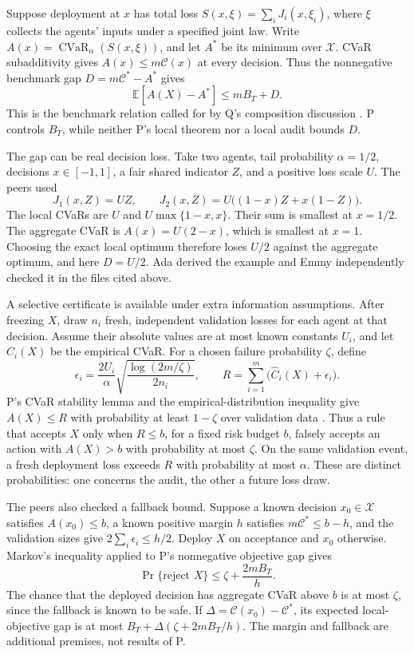 \documentclass{article}
\begin{document}
Suppose deployment at \(x\) has total loss \(S(x,\xi)=\sum_i J_i(x,\xi_i)\), where \(\xi\) collects the
agents' inputs under a specified joint law. Write \(A(x)=\operatorname{CVaR}_{\alpha}(S(x,\xi))\), and let
\(A^*\) be its minimum over \(\mathcal
X\). CVaR subadditivity gives \(A(x)\le m\mathcal C(x)\) at every decision. Thus the nonnegative benchmark gap
\(D=m\mathcal C^*-A^*\) gives
\[
\mathbb E[A(X)-A^*]\le mB_T+D.
\]
This is the benchmark relation called for by Q's composition discussion \cite{Q}. P controls \(B_T\), while
neither P's local theorem nor a local audit bounds \(D\).

The gap can be real decision loss. Take two agents, tail probability \(\alpha=1/2\), decisions \(x\in[-1,1]\),
a fair shared indicator \(Z\), and a positive loss scale \(U\). The peers used
\[
J_1(x,Z)=UZ,\qquad
J_2(x,Z)=U\bigl((1-x)Z+x(1-Z)\bigr).
\]
The local CVaRs are \(U\) and \(U\max\{1-x,x\}\). Their sum is smallest at \(x=1/2\). The aggregate CVaR is
\(A(x)=U(2-x)\), which is smallest at \(x=1\). Choosing the exact local optimum therefore loses \(U/2\)
against the aggregate optimum, and here \(D=U/2\). Ada derived the example and Emmy independently checked it
in the files cited above.

A selective certificate is available under extra information assumptions. After freezing \(X\), draw \(n_i\)
fresh, independent validation losses for each agent at that decision. Assume their absolute values are at most
known constants \(U_i\), and let \(\widehat C_i(X)\) be the empirical CVaR. For a chosen failure probability
\(\zeta\), define
\[
\epsilon_i=\frac{2U_i}{\alpha}
\sqrt{\frac{\log(2m/\zeta)}{2n_i}},
\qquad
R=\sum_{i=1}^{m}\bigl(\widehat C_i(X)+\epsilon_i\bigr).
\]
P's CVaR stability lemma and the empirical-distribution inequality give \(A(X)\le R\) with probability at
least \(1-\zeta\) over validation data \cite{P}. Thus a rule that accepts \(X\) only when \(R\le b\), for a
fixed risk budget \(b\), falsely accepts an action with \(A(X)>b\) with probability at most \(\zeta\). On the
same validation event, a fresh deployment loss exceeds \(R\) with probability at most \(\alpha\). These are
distinct probabilities: one concerns the audit, the other a future loss draw.

The peers also checked a fallback bound. Suppose a known decision \(x_0\in\mathcal X\) satisfies \(A(x_0)\le
b\), a known positive margin \(h\) satisfies \(m\mathcal C^*\le b-h\), and the validation sizes give
\(2\sum_i\epsilon_i\le h/2\). Deploy \(X\) on acceptance and \(x_0\) otherwise. Markov's inequality applied to
P's nonnegative objective gap gives
\[
\Pr\{\text{reject }X\}\le\zeta+\frac{2mB_T}{h}.
\]
The chance that the deployed decision has aggregate CVaR above \(b\) is at most \(\zeta\), since the fallback
is known to be safe. If \(\Delta=\mathcal C(x_0)-\mathcal C^*\), its expected local-objective gap is at most
\(B_T+\Delta(\zeta+2mB_T/h)\). The margin and fallback are additional premises, not results of P.
\end{document}
